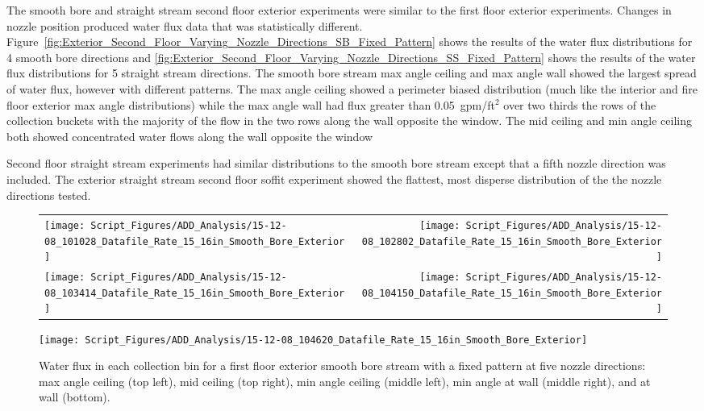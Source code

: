 \documentclass[12pt,oneside]{book}
\begin{document}
The smooth bore and straight stream second floor exterior experiments were similar to the first floor exterior experiments. Changes in nozzle position produced water flux data that was statistically different. Figure~\ref{fig:Exterior_Second_Floor_Varying_Nozzle_Directions_SB_Fixed_Pattern} shows the results of the water flux distributions for 4 smooth bore directions and \ref{fig:Exterior_Second_Floor_Varying_Nozzle_Directions_SS_Fixed_Pattern} shows the results of the water flux distributions for 5 straight stream directions. The smooth bore stream max angle ceiling and max angle wall showed the largest spread of water flux, however with different patterns. The max angle ceiling showed a perimeter biased distribution (much like the interior and fire floor exterior max angle distributions) while the max angle wall had flux greater than 0.05~gpm/ft$^2$ over two thirds the rows of the collection buckets with the majority of the flow in the two rows along the wall opposite the window. The mid ceiling and min angle ceiling both showed concentrated water flows along the wall opposite the window

Second floor straight stream experiments had similar distributions to the smooth bore stream except that a fifth nozzle direction was included. The exterior straight stream second floor soffit experiment showed the flattest, most disperse distribution of the the nozzle directions tested.

\begin{figure}[ht]
\begin{tabular*}{\textwidth}{lr}
\texttt{[image: Script\_Figures/ADD\_Analysis/15-12-08\_101028\_Datafile\_Rate\_15\_16in\_Smooth\_Bore\_Exterior]} &
\texttt{[image: Script\_Figures/ADD\_Analysis/15-12-08\_102802\_Datafile\_Rate\_15\_16in\_Smooth\_Bore\_Exterior]} \\
\texttt{[image: Script\_Figures/ADD\_Analysis/15-12-08\_103414\_Datafile\_Rate\_15\_16in\_Smooth\_Bore\_Exterior]} &
\texttt{[image: Script\_Figures/ADD\_Analysis/15-12-08\_104150\_Datafile\_Rate\_15\_16in\_Smooth\_Bore\_Exterior]} \\
\end{tabular*}
\centering
\texttt{[image: Script\_Figures/ADD\_Analysis/15-12-08\_104620\_Datafile\_Rate\_15\_16in\_Smooth\_Bore\_Exterior]} \\
\caption[Water Flux for Varying Nozzle Direction with Fixed First Floor Exterior Smooth Bore Stream]{Water flux in each collection bin for a first floor exterior smooth bore stream with a fixed pattern at five nozzle directions: max angle ceiling (top left), mid ceiling (top right), min angle ceiling (middle left), min angle at wall (middle right), and at wall (bottom).}
\label{fig:Exterior_First_Floor_Varying_Nozzle_Directions_SB_Fixed_Pattern}
\end{figure}
\end{document}
